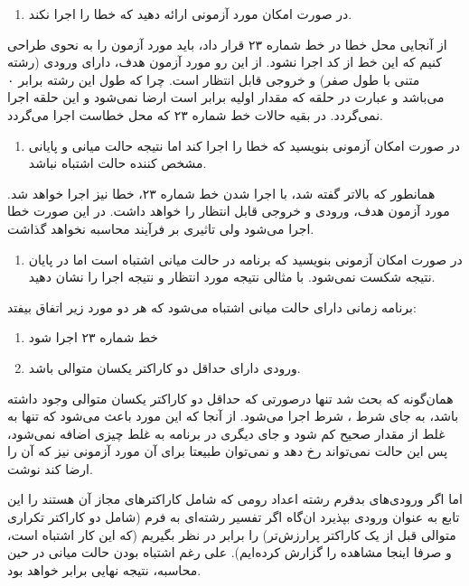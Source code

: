 \documentclass{article}
\newenvironment{answer}{}{\\[.3ex]}
\newenvironment{qitem}[1]{%
	\begin{enumerate}\item[(#1)]}{\end{enumerate}}
\begin{document}
\begin{qitem}{b}
در صورت امکان مورد آزمونی ارائه دهید که خطا را اجرا نکند.
\end{qitem}
\begin{answer}
از آنجایی محل خطا در خط شماره ۲۳ قرار داد، باید مورد آزمون را به نحوی طراحی کنیم که این خط از کد اجرا نشود. از این رو مورد آزمون هدف، دارای ورودی  (رشته متنی با طول صفر) و خروجی قابل انتظار  است. چرا که طول این رشته برابر ۰ می‌باشد و عبارت  در حلقه  که مقدار اولیه  برابر  است ارضا نمی‌شود و این حلقه اجرا نمی‌گردد.
در بقیه حالات خط شماره ۲۳ که محل خطاست اجرا می‌گردد.
\end{answer}
\begin{qitem}{c}
در صورت امکان آزمونی بنویسید که خطا را اجرا کند اما نتیجه حالت میانی و پایانی مشخص کننده حالت اشتباه نباشد.
\end{qitem}
\begin{answer}
همانطور که بالاتر گفته شد، با اجرا شدن خط شماره ۲۳، خطا نیز اجرا خواهد شد. مورد آزمون هدف، ورودی  و خروجی قابل انتظار  را خواهد داشت. در این صورت خطا اجرا می‌شود ولی تاثیری بر فرآیند محاسبه نخواهد گذاشت.
\end{answer}
\begin{qitem}{d}
در صورت امکان آزمونی بنویسید که برنامه در حالت میانی اشتباه است اما در پایان نتیجه شکست نمی‌شود. با مثالی نتیجه مورد انتظار و نتیجه اجرا را نشان دهید.
\end{qitem}
\begin{answer}
برنامه زمانی دارای حالت میانی اشتباه می‌شود که هر دو مورد زیر اتفاق بیفتد:
\begin{enumerate}
	\item خط شماره ۲۳ اجرا شود
	\item ورودی دارای حداقل دو کاراکتر یکسان متوالی باشد.
\end{enumerate}

همان‌گونه که بحث شد تنها درصورتی که حداقل دو کاراکتر یکسان متوالی وجود داشته باشد، به جای شرط ، شرط  اجرا می‌شود. از آنجا که این مورد باعث می‌شود که تنها به غلط از مقدار صحیح کم شود و جای دیگری در برنامه به غلط چیزی اضافه نمی‌شود، پس این حالت نمی‌تواند رخ دهد و نمی‌توان طبیعتا برای آن مورد آزمونی نیز که آن را ارضا کند نوشت.

اما اگر ورودی‌های بدفرم رشته اعداد رومی که شامل کاراکترهای مجاز آن هستند را این تابع به عنوان ورودی بپذیرد ان‌گاه اگر تفسیر رشته‌ای به فرم  (شامل دو کاراکتر تکراری متوالی قبل از یک کاراکتر پرارزش‌تر) را برابر  در نظر بگیریم (که این کار اشتباه است، و صرفا اینجا مشاهده را گزارش کرده‌ایم). علی رغم اشتباه بودن حالت میانی در حین محاسبه، نتیجه نهایی برابر  خواهد بود.
\end{answer}
\end{document}
